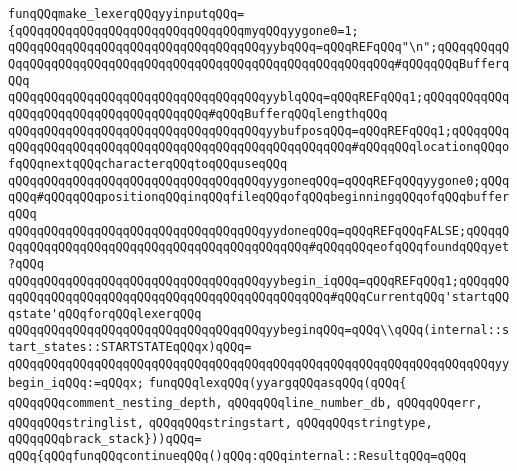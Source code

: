 \verb|funqQQqmake_lexerqQQqyyinputqQQq=|\newline
\verb|{qQQqqQQqqQQqqQQqqQQqqQQqqQQqqQQqmyqQQqyygone0=1;|\newline
\verb|qQQqqQQqqQQqqQQqqQQqqQQqqQQqqQQqqQQqyybqQQq=qQQqREFqQQq"\n";qQQqqQQqqQQqqQQqqQQqqQQqqQQqqQQqqQQqqQQqqQQqqQQqqQQqqQQqqQQqqQQq#qQQqqQQqBufferqQQq|\newline
\verb|qQQqqQQqqQQqqQQqqQQqqQQqqQQqqQQqqQQqyyblqQQq=qQQqREFqQQq1;qQQqqQQqqQQqqQQqqQQqqQQqqQQqqQQqqQQqqQQq#qQQqBufferqQQqlengthqQQq|\newline
\verb|qQQqqQQqqQQqqQQqqQQqqQQqqQQqqQQqqQQqyybufposqQQq=qQQqREFqQQq1;qQQqqQQqqQQqqQQqqQQqqQQqqQQqqQQqqQQqqQQqqQQqqQQqqQQqqQQq#qQQqqQQqlocationqQQqofqQQqnextqQQqcharacterqQQqtoqQQquseqQQq|\newline
\verb|qQQqqQQqqQQqqQQqqQQqqQQqqQQqqQQqqQQqyygoneqQQq=qQQqREFqQQqyygone0;qQQqqQQq#qQQqqQQqpositionqQQqinqQQqfileqQQqofqQQqbeginningqQQqofqQQqbufferqQQq|\newline
\verb|qQQqqQQqqQQqqQQqqQQqqQQqqQQqqQQqqQQqyydoneqQQq=qQQqREFqQQqFALSE;qQQqqQQqqQQqqQQqqQQqqQQqqQQqqQQqqQQqqQQqqQQqqQQq#qQQqqQQqeofqQQqfoundqQQqyet?qQQq|\newline
\verb|qQQqqQQqqQQqqQQqqQQqqQQqqQQqqQQqqQQqyybegin_iqQQq=qQQqREFqQQq1;qQQqqQQqqQQqqQQqqQQqqQQqqQQqqQQqqQQqqQQqqQQqqQQqqQQq#qQQqCurrentqQQq'startqQQqstate'qQQqforqQQqlexerqQQq|\newline
\newline
\verb|qQQqqQQqqQQqqQQqqQQqqQQqqQQqqQQqqQQqyybeginqQQq=qQQq\\qQQq(internal::start_states::STARTSTATEqQQqx)qQQq=|\newline
\verb|qQQqqQQqqQQqqQQqqQQqqQQqqQQqqQQqqQQqqQQqqQQqqQQqqQQqqQQqqQQqqQQqqQQqyybegin_iqQQq:=qQQqx;|\newline
\newline
\verb|funqQQqlexqQQq(yyargqQQqasqQQq(qQQq{|\newline
\verb|qQQqqQQqcomment_nesting_depth,|\newline
\verb|qQQqqQQqline_number_db,|\newline
\verb|qQQqqQQqerr,|\newline
\verb|qQQqqQQqstringlist,|\newline
\verb|qQQqqQQqstringstart,|\newline
\verb|qQQqqQQqstringtype,|\newline
\verb|qQQqqQQqbrack_stack}))qQQq=|\newline
\verb|qQQq{qQQqfunqQQqcontinueqQQq()qQQq:qQQqinternal::ResultqQQq=qQQq|\newline
